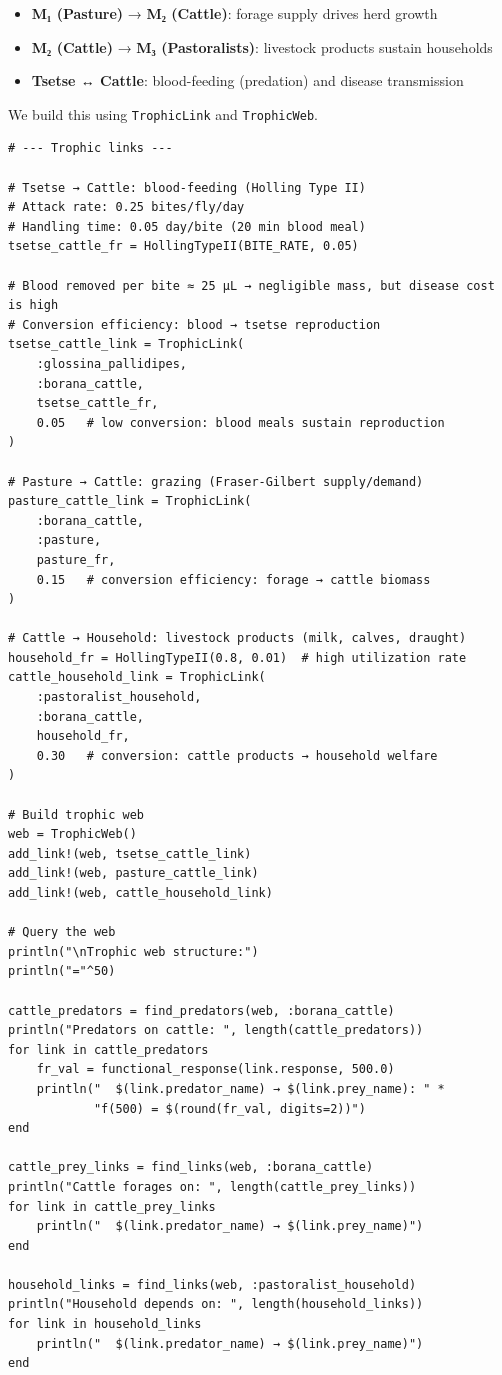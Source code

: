 \begin{itemize}
\item \textbf{M₁ (Pasture)} → \textbf{M₂ (Cattle)}: forage supply drives herd growth


\item \textbf{M₂ (Cattle)} → \textbf{M₃ (Pastoralists)}: livestock products sustain households


\item \textbf{Tsetse ↔ Cattle}: blood-feeding (predation) and disease transmission

\end{itemize}


We build this using \texttt{TrophicLink} and \texttt{TrophicWeb}.




\begin{verbatim}
# --- Trophic links ---

# Tsetse → Cattle: blood-feeding (Holling Type II)
# Attack rate: 0.25 bites/fly/day
# Handling time: 0.05 day/bite (20 min blood meal)
tsetse_cattle_fr = HollingTypeII(BITE_RATE, 0.05)

# Blood removed per bite ≈ 25 µL → negligible mass, but disease cost is high
# Conversion efficiency: blood → tsetse reproduction
tsetse_cattle_link = TrophicLink(
    :glossina_pallidipes,
    :borana_cattle,
    tsetse_cattle_fr,
    0.05   # low conversion: blood meals sustain reproduction
)

# Pasture → Cattle: grazing (Fraser-Gilbert supply/demand)
pasture_cattle_link = TrophicLink(
    :borana_cattle,
    :pasture,
    pasture_fr,
    0.15   # conversion efficiency: forage → cattle biomass
)

# Cattle → Household: livestock products (milk, calves, draught)
household_fr = HollingTypeII(0.8, 0.01)  # high utilization rate
cattle_household_link = TrophicLink(
    :pastoralist_household,
    :borana_cattle,
    household_fr,
    0.30   # conversion: cattle products → household welfare
)

# Build trophic web
web = TrophicWeb()
add_link!(web, tsetse_cattle_link)
add_link!(web, pasture_cattle_link)
add_link!(web, cattle_household_link)

# Query the web
println("\nTrophic web structure:")
println("="^50)

cattle_predators = find_predators(web, :borana_cattle)
println("Predators on cattle: ", length(cattle_predators))
for link in cattle_predators
    fr_val = functional_response(link.response, 500.0)
    println("  $(link.predator_name) → $(link.prey_name): " *
            "f(500) = $(round(fr_val, digits=2))")
end

cattle_prey_links = find_links(web, :borana_cattle)
println("Cattle forages on: ", length(cattle_prey_links))
for link in cattle_prey_links
    println("  $(link.predator_name) → $(link.prey_name)")
end

household_links = find_links(web, :pastoralist_household)
println("Household depends on: ", length(household_links))
for link in household_links
    println("  $(link.predator_name) → $(link.prey_name)")
end
\end{verbatim}




